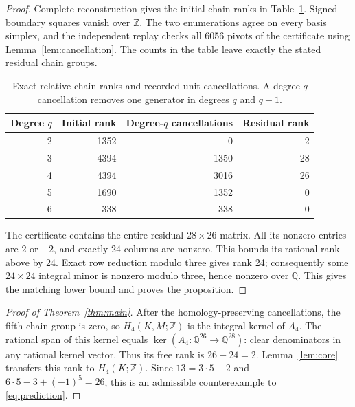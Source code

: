 \documentclass[11pt]{amsart}
\newcommand{\Z}{\mathbb Z}
\newcommand{\Q}{\mathbb Q}
\begin{document}
\begin{proof}
Complete reconstruction gives the initial chain ranks in
Table~\ref{tab:chains}. Signed boundary squares vanish over $\Z$.
The two enumerations agree on every basis simplex, and the independent
replay checks all 6056 pivots of the certificate using
Lemma~\ref{lem:cancellation}. The counts in the table leave exactly the
stated residual chain groups.

\begin{table}[ht]
\centering
\caption{Exact relative chain ranks and recorded unit cancellations.
A degree-$q$ cancellation removes one generator in degrees $q$ and $q-1$.}
\label{tab:chains}
\begin{tabular}{rrrr}
\toprule
Degree $q$ & Initial rank & Degree-$q$ cancellations & Residual rank\\
\midrule
2 & 1352 & 0 & 2\\
3 & 4394 & 1350 & 28\\
4 & 4394 & 3016 & 26\\
5 & 1690 & 1352 & 0\\
6 & 338 & 338 & 0\\
\bottomrule
\end{tabular}
\end{table}

The certificate contains the entire residual $28\times26$ matrix.
All its nonzero entries are $2$ or $-2$, and exactly 24 columns are
nonzero. This bounds its rational rank above by 24. Exact row reduction
modulo three gives rank 24; consequently some $24\times24$ integral
minor is nonzero modulo three, hence nonzero over $\Q$. This gives the
matching lower bound and proves the proposition.
\end{proof}

\begin{proof}[Proof of Theorem~\ref{thm:main}]
After the homology-preserving cancellations, the fifth chain group is
zero, so $H_4(K,M;\Z)$ is the integral kernel of $A_4$.
The rational span of this kernel equals $\ker(A_4:\Q^{26}\to\Q^{28})$:
clear denominators in any rational kernel vector. Thus its free rank is
$26-24=2$. Lemma~\ref{lem:core} transfers this rank to $H_4(K;\Z)$.
Since $13=3\cdot5-2$ and $6\cdot5-3+(-1)^5=26$, this is an admissible
counterexample to \eqref{eq:prediction}.
\end{proof}
\end{document}
